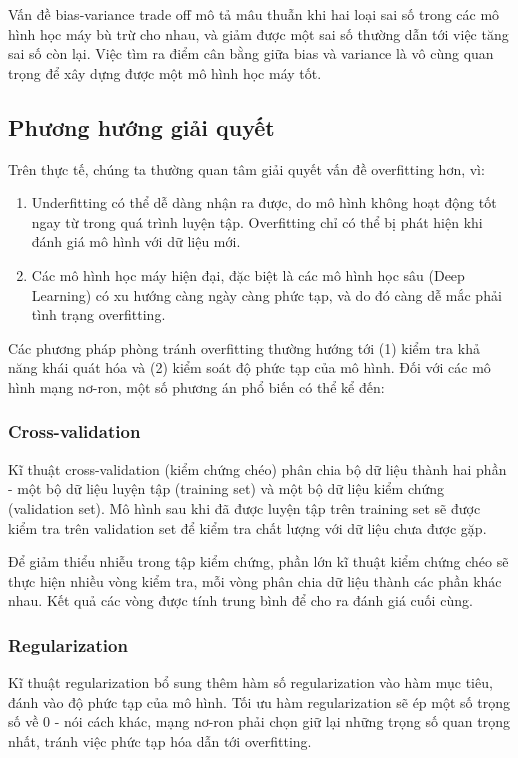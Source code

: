 \documentclass[12pt]{extreport}
\begin{document}
Vấn đề bias-variance trade off mô tả mâu thuẫn khi hai loại sai số trong các mô hình học máy bù trừ cho nhau, và giảm được một sai số thường dẫn tới việc tăng sai số còn lại. Việc tìm ra điểm cân bằng giữa bias và variance là vô cùng quan trọng để xây dựng được một mô hình học máy tốt.

\subsection{Phương hướng giải quyết}

Trên thực tế, chúng ta thường quan tâm giải quyết vấn đề overfitting hơn, vì:
\begin{enumerate}
    \item Underfitting có thể dễ dàng nhận ra được, do mô hình không hoạt động tốt ngay từ trong quá trình luyện tập. Overfitting chỉ có thể bị phát hiện khi đánh giá mô hình với dữ liệu mới.
    \item Các mô hình học máy hiện đại, đặc biệt là các mô hình học sâu (Deep Learning) có xu hướng càng ngày càng phức tạp, và do đó càng dễ mắc phải tình trạng overfitting.
\end{enumerate}

Các phương pháp phòng tránh overfitting thường hướng tới (1) kiểm tra khả năng khái quát hóa và (2) kiểm soát độ phức tạp của mô hình. Đối với các mô hình mạng nơ-ron, một số phương án phổ biến có thể kể đến:

\subsubsection{Cross-validation}

Kĩ thuật cross-validation (kiểm chứng chéo) phân chia bộ dữ liệu thành hai phần - một bộ dữ liệu luyện tập (training set) và một bộ dữ liệu kiểm chứng (validation set). Mô hình sau khi đã được luyện tập trên training set sẽ được kiểm tra trên validation set để kiểm tra chất lượng với dữ liệu chưa được gặp.

Để giảm thiểu nhiễu trong tập kiểm chứng, phần lớn kĩ thuật kiểm chứng chéo sẽ thực hiện nhiều vòng kiểm tra, mỗi vòng phân chia dữ liệu thành các phần khác nhau. Kết quả các vòng được tính trung bình để cho ra đánh giá cuối cùng.

\subsubsection{Regularization}

Kĩ thuật regularization bổ sung thêm hàm số regularization vào hàm mục tiêu, đánh vào độ phức tạp của mô hình. Tối ưu hàm regularization sẽ ép một số trọng số về 0 - nói cách khác, mạng nơ-ron phải chọn giữ lại những trọng số quan trọng nhất, tránh việc phức tạp hóa dẫn tới overfitting.
\end{document}
